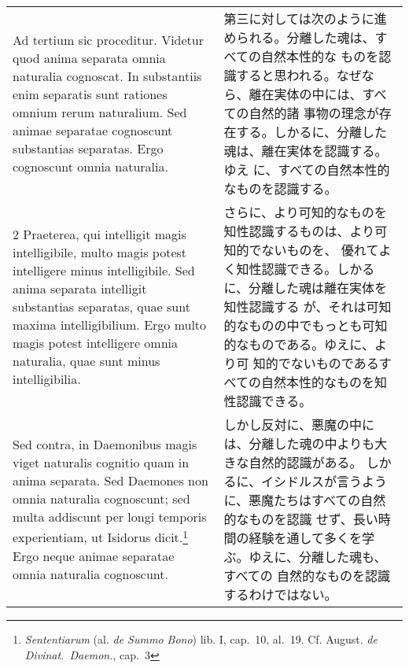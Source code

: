 \documentclass[10pt]{jsarticle} %
\begin{document}
\begin{longtable}{p{21em}p{21em}}


{\huge A}{\sc d tertium sic proceditur}. Videtur quod anima separata
omnia naturalia cognoscat. In substantiis enim separatis sunt rationes
omnium rerum naturalium. Sed animae separatae cognoscunt substantias
separatas. Ergo cognoscunt omnia naturalia.

&

第三に対しては次のように進められる。分離した魂は、すべての自然本性的な
ものを認識すると思われる。なぜなら、離在実体の中には、すべての自然的諸
事物の理念が存在する。しかるに、分離した魂は、離在実体を認識する。ゆえ
に、すべての自然本性的なものを認識する。

\\




2 {\sc Praeterea}, qui intelligit magis intelligibile, multo magis
potest intelligere minus intelligibile. Sed anima separata intelligit
substantias separatas, quae sunt maxima intelligibilium. Ergo multo
magis potest intelligere omnia naturalia, quae sunt minus
intelligibilia.

&

さらに、より可知的なものを知性認識するものは、より可知的でないものを、
優れてよく知性認識できる。しかるに、分離した魂は離在実体を知性認識する
が、それは可知的なものの中でもっとも可知的なものである。ゆえに、より可
知的でないものであるすべての自然本性的なものを知性認識できる。


\\




{\sc Sed contra}, in Daemonibus magis viget
naturalis cognitio quam in anima separata. Sed Daemones non omnia
naturalia cognoscunt; sed multa addiscunt per longi temporis
experientiam, ut Isidorus dicit.\footnote{{\it Sententiarum} (al. {\it
de Summo Bono}) lib. I, cap.~10, al.~19. Cf. August. {\it de
Divinat.~Daemon.}, cap.~3} Ergo neque animae separatae omnia naturalia
cognoscunt.

&

しかし反対に、悪魔の中には、分離した魂の中よりも大きな自然的認識がある。
しかるに、イシドルスが言うように、悪魔たちはすべての自然的なものを認識
せず、長い時間の経験を通して多くを学ぶ。ゆえに、分離した魂も、すべての
自然的なものを認識するわけではない。



\end{longtable}
\end{document}

